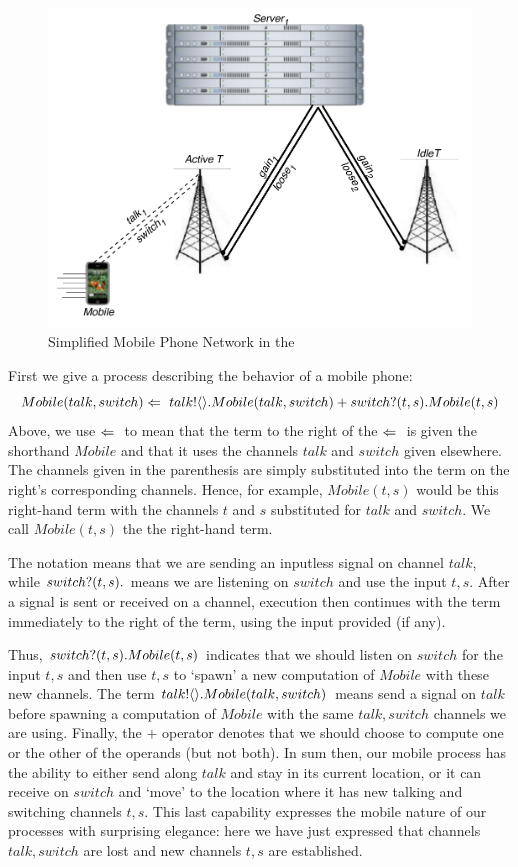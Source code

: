 	\begin{figure}[H]
	\centering
	\includegraphics[scale=0.7]{figures/cell_network_pi.pdf} %
	\caption{Simplified Mobile Phone Network in the \picalc}
	\label{fig_cell_network_pi}
	\end{figure}
	
	First we give a process describing the behavior of a mobile phone:
	\[
		Mobile(talk, switch) \Leftarrow\  {talk}!\langle{}\rangle. Mobile(talk,switch) + {switch}?({t,s}). Mobile(t,s)
	\]
	Above, we use $\Leftarrow\ $ to mean that the term to the right of the $\Leftarrow\ $ is given the shorthand $Mobile$ and that it uses the channels $talk$ and $switch$ given elsewhere.  The channels given in the parenthesis are simply substituted into the term on the right's corresponding channels.  Hence, for example, $Mobile(t,s)$ would be this right-hand term with the channels $t$ and $s$ substituted for $talk$ and $switch$. We call $Mobile(t,s)$ the  the right-hand term.
	
	The notation  means that we are sending an inputless signal on channel $talk$, while ${switch}?({t,s}).$ means we are listening on $switch$ and use the input $t,s$.  After a signal is sent or received on a channel, execution then continues with the term immediately to the right of the term, using the input provided (if any).  
	
	Thus, ${switch}?({t,s}). Mobile(t,s)$ indicates that we should listen on $switch$ for the input $t,s$ and then use $t,s$ to `spawn' a new computation of $Mobile$ with these new channels. The term ${talk}!\langle{}\rangle. Mobile(talk,switch)$ means send a signal on $talk$ before spawning a computation of $Mobile$ with the same $talk,switch$ channels we are using.  Finally, the $+$ operator denotes that we should choose to compute one or the other of the operands (but not both).  In sum then, our mobile process has the ability to either send along $talk$ and stay in its current location, or it can receive on $switch$ and `move' to the location where it has new talking and switching channels $t,s$.  This last capability expresses the mobile nature of our processes with surprising elegance: here we have just expressed that channels $talk,switch$ are lost and new channels $t,s$ are established.
	
